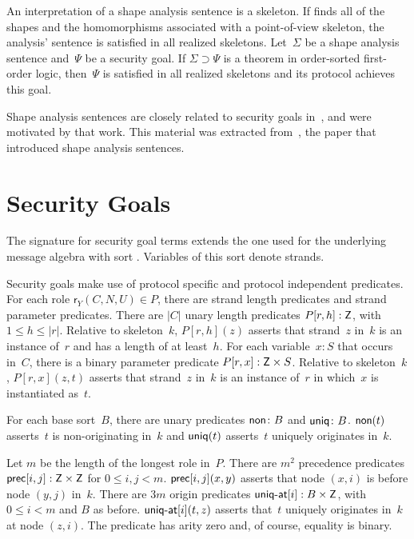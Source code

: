 \documentclass[12pt]{report}
\theoremstyle{definition}
\newcommand{\role}{\mathsf{r}}
\begin{document}
An interpretation of a shape analysis sentence is a skeleton.  If
{\cpsa} finds all of the shapes and the homomorphisms associated with
a point-of-view skeleton, the analysis' sentence is satisfied in all
realized skeletons.  Let~$\Sigma$ be a shape analysis sentence
and~$\Psi$ be a security goal.  If $\Sigma\supset\Psi$ is a theorem in
order-sorted first-order logic, then~$\Psi$ is satisfied in all
realized skeletons and its protocol achieves this goal.

Shape analysis sentences are closely related to security goals
in~\cite{guttman09}, and were motivated by that work.  This material
was extracted from~\cite{ramsdell12}, the paper that introduced shape
analysis sentences.

\section{Security Goals}\label{sec:security goals}

The signature for security goal terms extends the one used for the
underlying message algebra with sort .  Variables of this sort
denote strands.

Security goals make use of protocol specific and protocol independent
predicates.  For each role $\role_Y(C,N,U)\in P$, there are strand length
predicates and strand parameter predicates.  There are $|C|$ unary
length predicates $P[r,h]:\mathsf{Z}$, with $1\leq h\leq|r|$.  Relative
to skeleton~$k$, $P[r,h](z)$ asserts that strand~$z$ in~$k$ is an
instance of~$r$ and has a length of at least~$h$.  For each
variable~$x:S$ that occurs in~$C$, there is a binary parameter
predicate $P[r,x]:\mathsf{Z}\times{}S$.  Relative to skeleton~$k$,
$P[r,x](z,t)$ asserts that strand~$z$ in~$k$ is an instance of~$r$ in
which~$x$ is instantiated as~$t$.

For each base sort~$B$, there are unary predicates $\operatorname{\mathsf{non}}\colon B$
and $\operatorname{\mathsf{uniq}}\colon B$.  $\operatorname{\mathsf{non}}(t)$ asserts~$t$ is non-originating
in~$k$ and $\operatorname{\mathsf{uniq}}(t)$ asserts~$t$ uniquely originates in~$k$.

Let $m$ be the length of the longest role in~$P$.  There are $m^2$
precedence predicates $\operatorname{\mathsf{prec}}[i,j]:\mathsf{Z}\times\mathsf{Z}$ for $0\leq
i,j< m$.  $\operatorname{\mathsf{prec}}[i,j](x,y)$ asserts that node $(x,i)$ is before
node $(y,j)$ in~$k$.  There are $3m$ origin predicates
$\operatorname{\mathsf{uniq-at}}[i]:B\times\mathsf{Z}$, with $0\leq i< m$ and $B$ as before.
$\operatorname{\mathsf{uniq-at}}[i](t,z)$ asserts that~$t$ uniquely originates in~$k$ at
node $(z,i)$.  The predicate  has arity zero and, of course,
equality is binary.
\end{document}
